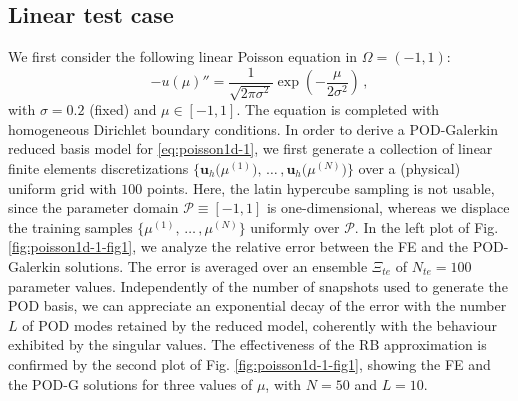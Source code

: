 \documentclass[12pt, a4paper, twoside, openright, notitlepage]{report}
\numberwithin{equation}{chapter}
\theoremstyle{theorem}
\theoremstyle{definition}
\theoremstyle{remark}
\theoremstyle{proposition}
\numberwithin{figure}{chapter}
\begin{document}
	\subsection{Linear test case}
	\label{section:poisson1d-1}
	
		We first consider the following linear Poisson equation in $\Omega = (-1,1)$:
		\begin{equation}
			\label{eq:poisson1d-1}
			- u(\mu)'' = \dfrac{1}{\sqrt{2 \pi \sigma^2}} \exp \left( -\dfrac{\mu}{2 \sigma^2} \right) \, ,
		\end{equation}
		with $\sigma = 0.2$ (fixed) and $\mu \in [-1,1]$. The equation is completed with homogeneous Dirichlet boundary conditions. In order to derive a POD-Galerkin reduced basis model for \eqref{eq:poisson1d-1}, we first generate a collection of linear finite elements discretizations $\big\lbrace \mathbf{u}_h \big( \mu^{(1)} \big), \, \ldots \, , \mathbf{u}_h \big( \mu^{(N)} \big) \big\rbrace$ over a (physical) uniform grid with $100$ points. Here, the latin hypercube sampling is not usable, since the parameter domain $\mathcal{P} \equiv [-1,1]$ is one-dimensional, whereas we displace the training samples $\big\lbrace \mu^{(1)}, \, \ldots \, , \mu^{(N)} \big\rbrace$ uniformly over $\mathcal{P}$. In the left plot of Fig. \ref{fig:poisson1d-1-fig1}, we analyze the relative error between the FE and the POD-Galerkin solutions. The error is averaged over an ensemble $\Xi_{te}$ of $N_{te} = 100$ parameter values. Independently of the number of snapshots used to generate the POD basis, we can appreciate an exponential decay of the error with the number $L$ of POD modes retained by the reduced model, coherently with the behaviour exhibited by the singular values. The effectiveness of the RB approximation is confirmed by the second plot of Fig. \ref{fig:poisson1d-1-fig1}, showing the FE and the POD-G solutions for three values of $\mu$, with $N = 50$ and $L = 10$.
		
\end{document}
